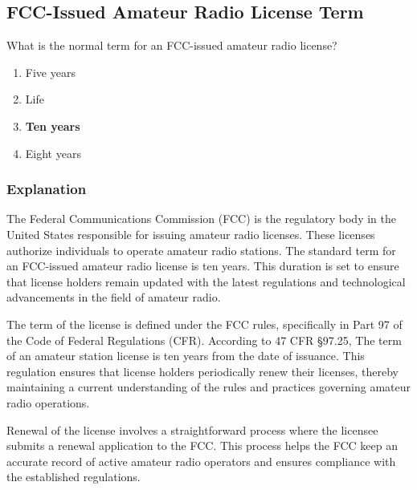 \subsection{FCC-Issued Amateur Radio License Term}
\label{T1C08}

\begin{tcolorbox}[colback=gray!10!white,colframe=black!75!black,title=T1C08]
What is the normal term for an FCC-issued amateur radio license?
\begin{enumerate}[label=\Alph*)]
    \item Five years
    \item Life
    \item \textbf{Ten years}
    \item Eight years
\end{enumerate}
\end{tcolorbox}

\subsubsection{Explanation}
The Federal Communications Commission (FCC) is the regulatory body in the United States responsible for issuing amateur radio licenses. These licenses authorize individuals to operate amateur radio stations. The standard term for an FCC-issued amateur radio license is ten years. This duration is set to ensure that license holders remain updated with the latest regulations and technological advancements in the field of amateur radio.

The term of the license is defined under the FCC rules, specifically in Part 97 of the Code of Federal Regulations (CFR). According to 47 CFR §97.25, The term of an amateur station license is ten years from the date of issuance. This regulation ensures that license holders periodically renew their licenses, thereby maintaining a current understanding of the rules and practices governing amateur radio operations.

Renewal of the license involves a straightforward process where the licensee submits a renewal application to the FCC. This process helps the FCC keep an accurate record of active amateur radio operators and ensures compliance with the established regulations.

